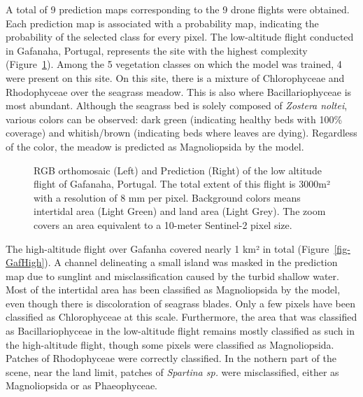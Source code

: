 \documentclass[
  number]{elsarticle}
\begin{document}
A total of 9 prediction maps corresponding to the 9 drone flights were
obtained. Each prediction map is associated with a probability map,
indicating the probability of the selected class for every pixel. The
low-altitude flight conducted in Gafanaha, Portugal, represents the site
with the highest complexity (Figure~\ref{fig-GafLow}). Among the 5
vegetation classes on which the model was trained, 4 were present on
this site. On this site, there is a mixture of Chlorophyceae and
Rhodophyceae over the seagrass meadow. This is also where
Bacillariophyceae is most abundant. Although the seagrass bed is solely
composed of \emph{Zostera noltei}, various colors can be observed: dark
green (indicating healthy beds with 100\% coverage) and whitish/brown
(indicating beds where leaves are dying). Regardless of the color, the
meadow is predicted as Magnoliopsida by the model.

\label{cell-fig-GafLow}
\begin{figure}[H]


\caption{\label{fig-GafLow}RGB orthomosaic (Left) and Prediction (Right)
of the low altitude flight of Gafanaha, Portugal. The total extent of
this flight is 3000m² with a resolution of 8 mm per pixel. Background
colors means intertidal area (Light Green) and land area (Light Grey).
The zoom covers an area equivalent to a 10-meter Sentinel-2 pixel size.}

\end{figure}%

The high-altitude flight over Gafanha covered nearly 1 km² in total
(Figure~\ref{fig-GafHigh}). A channel delineating a small island was
masked in the prediction map due to sunglint and misclassification
caused by the turbid shallow water. Most of the intertidal area has been
classified as Magnoliopsida by the model, even though there is
discoloration of seagrass blades. Only a few pixels have been classified
as Chlorophyceae at this scale. Furthermore, the area that was
classified as Bacillariophyceae in the low-altitude flight remains
mostly classified as such in the high-altitude flight, though some
pixels were classified as Magnoliopsida. Patches of Rhodophyceae were
correctly classified. In the nothern part of the scene, near the land
limit, patches of \emph{Spartina sp.} were misclassified, either as
Magnoliopsida or as Phaeophyceae.
\end{document}
